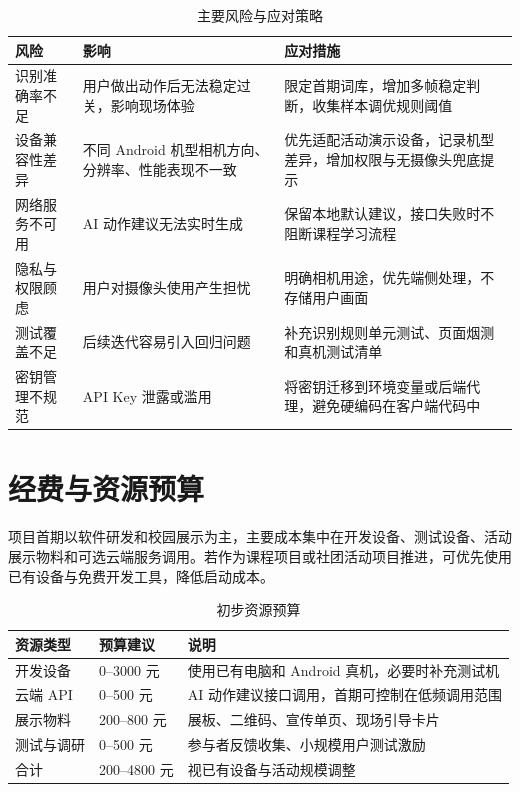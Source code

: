 \documentclass[UTF8,a4paper,12pt]{ctexart}
\begin{document}
\begin{table}[htbp]
\centering
\caption{主要风险与应对策略}
\begin{tabularx}{\textwidth}{p{3.2cm}Y Y}
\toprule
风险 & 影响 & 应对措施 \\
\midrule
识别准确率不足 & 用户做出动作后无法稳定过关，影响现场体验 & 限定首期词库，增加多帧稳定判断，收集样本调优规则阈值 \\
设备兼容性差异 & 不同 Android 机型相机方向、分辨率、性能表现不一致 & 优先适配活动演示设备，记录机型差异，增加权限与无摄像头兜底提示 \\
网络服务不可用 & AI 动作建议无法实时生成 & 保留本地默认建议，接口失败时不阻断课程学习流程 \\
隐私与权限顾虑 & 用户对摄像头使用产生担忧 & 明确相机用途，优先端侧处理，不存储用户画面 \\
测试覆盖不足 & 后续迭代容易引入回归问题 & 补充识别规则单元测试、页面烟测和真机测试清单 \\
密钥管理不规范 & API Key 泄露或滥用 & 将密钥迁移到环境变量或后端代理，避免硬编码在客户端代码中 \\
\bottomrule
\end{tabularx}
\end{table}

\section{经费与资源预算}

项目首期以软件研发和校园展示为主，主要成本集中在开发设备、测试设备、活动展示物料和可选云端服务调用。若作为课程项目或社团活动项目推进，可优先使用已有设备与免费开发工具，降低启动成本。

\begin{table}[htbp]
\centering
\caption{初步资源预算}
\begin{tabularx}{\textwidth}{p{3cm}p{3cm}Y}
\toprule
资源类型 & 预算建议 & 说明 \\
\midrule
开发设备 & 0--3000 元 & 使用已有电脑和 Android 真机，必要时补充测试机 \\
云端 API & 0--500 元 & AI 动作建议接口调用，首期可控制在低频调用范围 \\
展示物料 & 200--800 元 & 展板、二维码、宣传单页、现场引导卡片 \\
测试与调研 & 0--500 元 & 参与者反馈收集、小规模用户测试激励 \\
合计 & 200--4800 元 & 视已有设备与活动规模调整 \\
\bottomrule
\end{tabularx}
\end{table}
\end{document}
